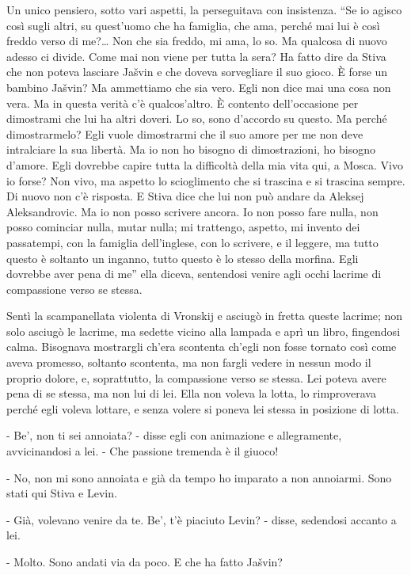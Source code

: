 Un unico pensiero, sotto vari aspetti, la perseguitava con insistenza. ``Se io agisco così sugli altri, su quest'uomo che ha famiglia, che ama, perché mai lui è così freddo verso di me?\ldots{} Non che sia freddo, mi ama, lo so. Ma qualcosa di nuovo adesso ci divide. Come mai non viene per tutta la sera? Ha fatto dire da Stiva che non poteva lasciare Jašvin e che doveva sorvegliare il suo gioco. È forse un bambino Jašvin? Ma ammettiamo che sia vero. Egli non dice mai una cosa non vera. Ma in questa verità c'è qualcos'altro. È contento dell'occasione per dimostrami che lui ha altri doveri. Lo so, sono d'accordo su questo. Ma perché dimostrarmelo? Egli vuole dimostrarmi che il suo amore per me non deve intralciare la sua libertà. Ma io non ho bisogno di dimostrazioni, ho bisogno d'amore. Egli dovrebbe capire tutta la difficoltà della mia vita qui, a Mosca. Vivo io forse? Non vivo, ma aspetto lo scioglimento che si trascina e si trascina sempre. Di nuovo non c'è risposta. E Stiva dice che lui non può andare da Aleksej Aleksandrovic. Ma io non posso scrivere ancora. Io non posso fare nulla, non posso cominciar nulla, mutar nulla; mi trattengo, aspetto, mi invento dei passatempi, con la famiglia dell'inglese, con lo scrivere, e il leggere, ma tutto questo è soltanto un inganno, tutto questo è lo stesso della morfina. Egli dovrebbe aver pena di me'' ella diceva, sentendosi venire agli occhi lacrime di compassione verso se stessa. 

Sentì la scampanellata violenta di Vronskij e asciugò in fretta queste lacrime; non solo asciugò le lacrime, ma sedette vicino alla lampada e aprì un libro, fingendosi calma. Bisognava mostrargli ch'era scontenta ch'egli non fosse tornato così come aveva promesso, soltanto scontenta, ma non fargli vedere in nessun modo il proprio dolore, e, soprattutto, la compassione verso se stessa. Lei poteva avere pena di se stessa, ma non lui di lei. Ella non voleva la lotta, lo rimproverava perché egli voleva lottare, e senza volere si poneva lei stessa in posizione di lotta. 

- Be', non ti sei annoiata? - disse egli con animazione e allegramente, avvicinandosi a lei. - Che passione tremenda è il giuoco! 

- No, non mi sono annoiata e già da tempo ho imparato a non annoiarmi. Sono stati qui Stiva e Levin. 

- Già, volevano venire da te. Be', t'è piaciuto Levin? - disse, sedendosi accanto a lei. 

- Molto. Sono andati via da poco. E che ha fatto Jašvin? 

